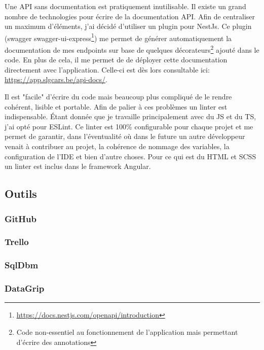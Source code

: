 \newpara

Une API sans documentation est pratiquement inutilisable. Il existe un grand nombre de technologies pour écrire de la documentation API. Afin de centraliser un maximum d'éléments, j'ai décidé d'utiliser un plugin pour NestJs. Ce plugin (swagger swagger-ui-express\footnote{\url{https://docs.nestjs.com/openapi/introduction}}) me permet de générer automatiquement la documentation de mes endpoints sur base de quelques décorateurs\footnote{Code non-essentiel au fonctionnement de l'application mais permettant d'écrire des annotations} ajouté dans le code. En plus de cela, il me permet de de déployer cette documentation directement avec l'application. Celle-ci est dès lors consultable ici:\\\url{https://app.slgcars.be/api-docs/}.

\newpage


Il est "facile" d'écrire du code mais beaucoup plus compliqué de le rendre cohérent, lisible et portable. Afin de palier à ces problèmes un linter est indispensable. Étant donnée que je travaille principalement avec du JS et du TS, j'ai opté pour ESLint. Ce linter est 100\% configurable pour chaque projet et me permet de garantir, dans l'éventualité où dans le future un autre développeur venait à contribuer au projet, la cohérence de nommage des variables, la configuration de l'IDE et bien d'autre choses. Pour ce qui est du HTML et SCSS un linter est inclus dans le framework Angular.

\subsection{Outils}

\subsubsection{GitHub}
\subsubsection{Trello}
\subsubsection{SqlDbm}
\subsubsection{DataGrip}